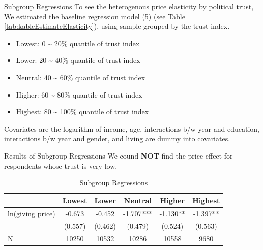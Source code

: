 \documentclass[
  ignorenonframetext,
]{beamer}
\providecommand{\tightlist}{%
  \setlength{\itemsep}{0pt}\setlength{\parskip}{0pt}}
\begin{document}
\begin{frame}{Subgroup Regressions}
\protect\hypertarget{subgroup-regressions}{}
To see the heterogenous price elasticity by political trust, We
estimated the baseline regression model (5) (see Table
\ref{tab:kableEstimateElasticity}), using sample grouped by the trust
index.

\begin{itemize}
\tightlist
\item
  Lowest: 0 \textasciitilde{} 20\% quantile of trust index
\item
  Lower: 20 \textasciitilde{} 40\% quantile of trust index
\item
  Neutral: 40 \textasciitilde{} 60\% quantile of trust index
\item
  Higher: 60 \textasciitilde{} 80\% quantile of trust index
\item
  Highest: 80 \textasciitilde{} 100\% quantile of trust index
\end{itemize}

Covariates are the logarithm of income, age, interactions b/w year and
education, interactions b/w year and gender, and living are dummy into
covariates.
\end{frame}

\begin{frame}{Results of Subgroup Regressions}
\protect\hypertarget{results-of-subgroup-regressions}{}
We cound \textbf{NOT} find the price effect for respondents whose trust
is very low.

\begin{table}

\caption{\label{tab:kableEstimateElasticityByTrustGroup}Subgroup Regressions}
\centering
\fontsize{9}{11}\selectfont
\begin{tabular}[t]{lccccc}
\toprule
 & Lowest & Lower & Neutral & Higher & Highest\\
\midrule
ln(giving price) & -0.673 & -0.452 & -1.707*** & -1.130** & -1.397**\\
 & (0.557) & (0.462) & (0.479) & (0.524) & (0.563)\\
N & 10250 & 10532 & 10286 & 10558 & 9680\\
\bottomrule
\end{tabular}
\end{table}
\end{frame}
\end{document}
